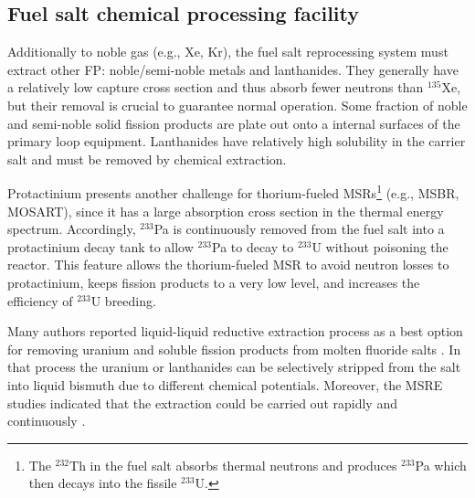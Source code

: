 \subsection{Fuel salt chemical processing facility} \label{sec:chemical_processing}
Additionally to noble gas (e.g., Xe, Kr), the fuel salt reprocessing system  
must extract other \gls{FP}: noble/semi-noble metals and lanthanides. They  
generally have a relatively low capture cross section and thus absorb fewer 
neutrons than $^{135}$Xe, but their removal is crucial to guarantee normal  
operation. Some fraction of noble and semi-noble solid fission products are 
plate out onto a internal surfaces of the primary loop equipment. Lanthanides 
have relatively high solubility in the carrier salt and must be removed by 
chemical extraction. 

Protactinium presents another challenge for thorium-fueled 
\glspl{MSR}\footnote{The $^{232}$Th in the fuel salt absorbs thermal neutrons 
and produces $^{233}$Pa which then decays into the fissile $^{233}$U.} (e.g., 
\gls{MSBR}, \gls{MOSART}), since it has a large absorption
cross section in  
the thermal energy spectrum. Accordingly, $^{233}$Pa is continuously removed 
from the fuel salt into a protactinium
decay tank to allow $^{233}$Pa to decay 
to $^{233}$U without poisoning the reactor. This feature allows the 
thorium-fueled \gls{MSR} to avoid neutron losses
to protactinium, keeps 
fission products to a very low level, and increases the
efficiency of 
$^{233}$U breeding. 

Many authors reported liquid-liquid reductive extraction process as a best 
option for removing uranium and soluble fission products from 
molten fluoride salts \cite{briggs_molten-salt_1969, delpech_molten_2010, 
doligez_coupled_2014}. In that process the uranium or lanthanides can be 
selectively stripped from the salt into liquid bismuth due to different 
chemical potentials. Moreover, the \gls{MSRE} studies indicated that the 
extraction could be carried out rapidly and continuously  
\cite{whatley_engineering_1970-1}.


